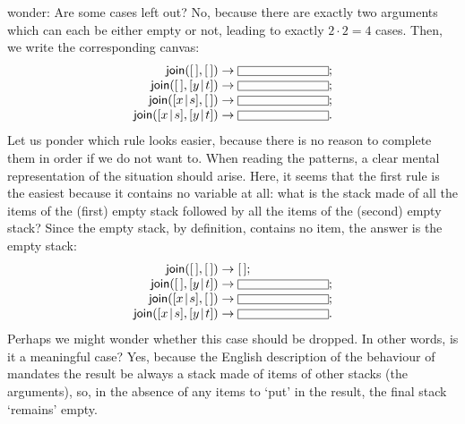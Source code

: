 wonder: Are some cases left out? No, because there are exactly two
arguments which can each be either empty or not, leading to exactly
\(2 \cdot 2 = 4\) cases. Then, we write the corresponding canvas:
\begin{equation*}
\begin{array}{r@{\;}l@{\;}l}
\fun{join}(\el,\el) & \rightarrow & \fbcode{CCCCCCCCCC};\\
\fun{join}(\el,\cons{y}{t}) & \rightarrow & \fbcode{CCCCCCCCCC};\\
\fun{join}(\cons{x}{s},\el) & \rightarrow & \fbcode{CCCCCCCCCC};\\
\fun{join}(\cons{x}{s},\cons{y}{t}) & \rightarrow & \fbcode{CCCCCCCCCC}.
\end{array}
\end{equation*}
Let us ponder which rule looks easier, because there is no reason to
complete them in order if we do not want to. When reading the
patterns, a clear mental representation of the situation should
arise. Here, it seems that the first rule is the easiest because it
contains no variable at all: what is the stack made of all the items
of the (first) empty stack followed by all the items of the (second)
empty stack? Since the empty stack, by definition, contains no item,
the answer is the empty stack:
\begin{equation*}
\begin{array}{r@{\;}l@{\;}l}
\fun{join}(\el,\el) & \rightarrow & \el;\\
\fun{join}(\el,\cons{y}{t}) & \rightarrow & \fbcode{CCCCCCCCCC};\\
\fun{join}(\cons{x}{s},\el) & \rightarrow & \fbcode{CCCCCCCCCC};\\
\fun{join}(\cons{x}{s},\cons{y}{t}) & \rightarrow & \fbcode{CCCCCCCCCC}.
\end{array}
\end{equation*}
Perhaps we might wonder whether this case should be dropped. In other
words, is it a meaningful case? Yes, because the English description
of the behaviour of  mandates the result be always a stack
made of items of other stacks (the arguments), so, in the absence of
any items to `put' in the result, the final stack `remains' empty.

